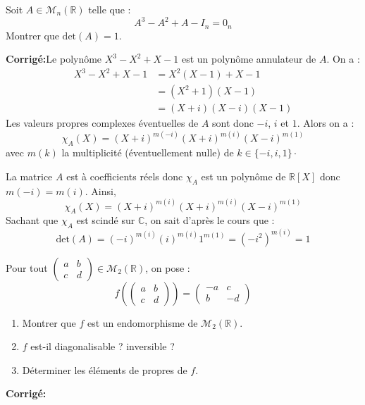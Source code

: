 \documentclass[a4paper,twoside,french,10pt]{VcCours}
\newcommand{\corr}{\textbf{Corrigé:}}
\begin{document}
\begin{Exercice}{} Soit $A \in \mathcal{M}_{n}(\mathbb{R})$ telle que :
  \[
  A^{3} - A^{2} + A - I_n = 0_n
  \]
Montrer que $\textrm{det}(A) = 1$.
\end{Exercice}

\corr Le polynôme $X^3-X^2+X-1$ est un polynôme annulateur de $A$. On a :
\begin{align*}
X^3-X^2+X-1 & = X^2(X-1)+X-1 \\
& = (X^2+1)(X-1) \\
& = (X+i)(X-i)(X-1)
\end{align*}
Les valeurs propres complexes éventuelles de $A$ sont donc $-i$, $i$ et $1$. Alors on a :
$$ \chi_A(X)= (X+i)^{m(-i)} (X+i)^{m(i)} (X-i)^{m(1)}$$
avec $m(k)$ la multiplicité (éventuellement nulle) de $k \in \lbrace -i, i ,1 \rbrace \cdot$


La matrice $A$ est à coefficients réels donc $\chi_A$ est un polynôme de $\mathbb{R}[X]$ donc $m(-i)=m(i)$. Ainsi,
$$ \chi_A(X) = (X+i)^{m(i)} (X+i)^{m(i)} (X-i)^{m(1)}$$
Sachant que $\chi_A$ est scindé sur $\mathbb{C}$, on sait d'après le cours que :
$$ \textrm{det}(A) = (-i)^{m(i)} (i)^{m(i)} 1^{m(1)} = (-i^2)^{m(i)} = 1$$


\begin{Exercice}{} Pour tout $\begin{pmatrix}
a & b \\
c & d 
\end{pmatrix} \in \mathcal{M}_2(\mathbb{R})$, on pose :
$$ f \left( \begin{pmatrix}
a & b \\
c & d 
\end{pmatrix} \right) = \begin{pmatrix}
-a & c \\
b & -d 
\end{pmatrix}$$

\begin{enumerate}
\item Montrer que $f$ est un endomorphisme de $\mathcal{M}_2(\mathbb{R})$.
\item $f$ est-il diagonalisable ? inversible ?
\item Déterminer les éléments de propres de $f$.
\end{enumerate}
\end{Exercice}

\corr 
\end{document}

